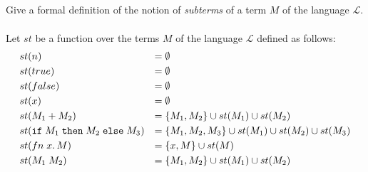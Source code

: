 \subsection{}

Give a formal definition of the notion of \emph{subterms} of a term $M$ of the language $\mathcal{L}$.\\\\
Let $st$ be a function over the terms $M$ of the language $\mathcal{L}$ defined as follows:
\begin{align*}
	 & st(n)                  & =\; & \emptyset                                                  \\
	 & st(true)               & =\; & \emptyset                                                  \\
	 & st(false)              & =\; & \emptyset                                                  \\
	 & st(x)                  & =\; & \emptyset                                                  \\
	 & st(M_1+M_2)     & =\; & \{ M_1, M_2 \} \cup st(M_1) \cup st(M_2)                   \\
	 & st(\texttt{if}\;M_1\;\texttt{then}\;M_2\;\texttt{else}\;M_3) & =\; & \{ M_1, M_2, M_3 \} \cup st(M_1) \cup st(M_2) \cup st(M_3) \\
	 & st(fn\;x.\,M)          & =\; & \{ x, M \} \cup st(M)                                      \\
	 & st(M_1\;M_2)     & =\; & \{ M_1, M_2 \} \cup st(M_1) \cup st(M_2)                   \\
\end{align*}

